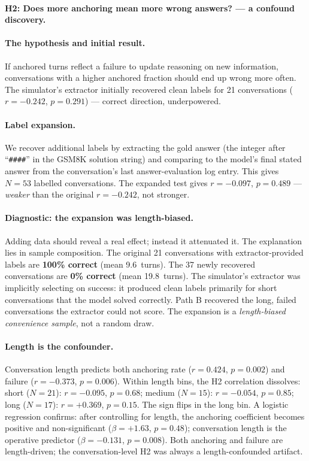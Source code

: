 \documentclass{article}
\begin{document}
\paragraph{H2: Does more anchoring mean more wrong answers? --- a confound discovery.}
\label{subsec:h2}

\paragraph{The hypothesis and initial result.}
If anchored turns reflect a failure to update reasoning on new
information, conversations with a higher anchored fraction should
end up wrong more often.
The simulator's extractor initially recovered clean labels for 21
conversations ($r = -0.242$, $p = 0.291$) --- correct direction,
underpowered.

\paragraph{Label expansion.}
We recover additional labels by extracting the gold answer
(the integer after ``\texttt{\#\#\#\#}'' in the GSM8K solution string)
and comparing to the model's final stated answer from the conversation's
last answer-evaluation log entry.
This gives $N = 53$ labelled conversations.
The expanded test gives $r = -0.097$, $p = 0.489$ ---
\emph{weaker} than the original $r = -0.242$, not stronger.

\paragraph{Diagnostic: the expansion was length-biased.}
Adding data should reveal a real effect; instead it attenuated it.
The explanation lies in sample composition.
The original 21 conversations with extractor-provided labels are
\textbf{100\% correct} (mean 9.6~turns).
The 37 newly recovered conversations are \textbf{0\% correct}
(mean 19.8~turns).
The simulator's extractor was implicitly selecting on success:
it produced clean labels primarily for short conversations
that the model solved correctly.
Path B recovered the long, failed conversations the extractor could not score.
The expansion is a \emph{length-biased convenience sample}, not a
random draw.

\paragraph{Length is the confounder.}
Conversation length predicts both anchoring rate
($r = 0.424$, $p = 0.002$) and failure ($r = -0.373$, $p = 0.006$).
Within length bins, the H2 correlation dissolves: short ($N=21$):
$r = -0.095$, $p = 0.68$; medium ($N=15$): $r = -0.054$, $p = 0.85$;
long ($N=17$): $r = +0.369$, $p = 0.15$.
The sign flips in the long bin.
A logistic regression confirms: after controlling for length, the
anchoring coefficient becomes positive and non-significant
($\beta = +1.63$, $p = 0.48$); conversation length is the operative
predictor ($\beta = -0.131$, $p = 0.008$).
Both anchoring and failure are length-driven; the conversation-level
H2 was always a length-confounded artifact.
\end{document}
